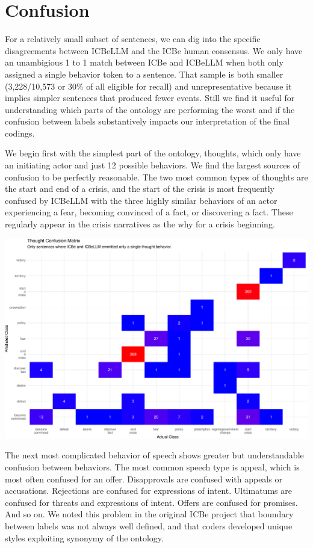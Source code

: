\documentclass[
]{article}
\begin{document}
\section{Confusion}\label{confusion}

For a relatively small subset of sentences, we can dig into the specific
disagreements between ICBeLLM and the ICBe human consensus. We only have
an unambigious 1 to 1 match between ICBe and ICBeLLM when both only
assigned a single behavior token to a sentence. That sample is both
smaller (3,228/10,573 or 30\% of all eligible for recall) and
unrepresentative because it implies simpler sentences that produced
fewer events. Still we find it useful for understanding which parts of
the ontology are performing the worst and if the confusion between
labels substantively impacts our interpretation of the final codings.

We begin first with the simplest part of the ontology, thoughts, which
only have an initiating actor and just 12 possible behaviors. We find
the largest sources of confusion to be perfectly reasonable. The two
most common types of thoughts are the start and end of a crisis, and the
start of the crisis is most frequently confused by ICBeLLM with the
three highly similar behaviors of an actor experiencing a fear, becoming
convinced of a fact, or discovering a fact. These regularly appear in
the crisis narratives as the why for a crisis beginning.

\includegraphics{arxiv_Douglass_et_al_2024_ICBeLLM_files/figure-pdf/unnamed-chunk-9-1.pdf}

The next most complicated behavior of speech shows greater but
understandable confusion between behaviors. The most common speech type
is appeal, which is most often confused for an offer. Disapprovals are
confused with appeals or accusations. Rejections are confused for
expressions of intent. Ultimatums are confused for threats and
expressions of intent. Offers are confused for promises. And so on. We
noted this problem in the original ICBe project that boundary between
labels was not always well defined, and that coders developed unique
styles exploiting synonymy of the ontology.
\end{document}
